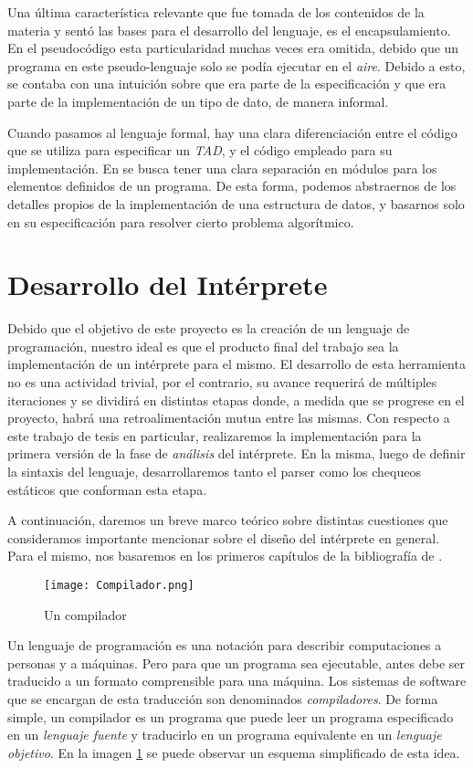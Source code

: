 Una última característica relevante que fue tomada de los contenidos de la materia y sentó las bases para el desarrollo del lenguaje, es el encapsulamiento.
En el pseudocódigo esta particularidad muchas veces era omitida, debido que un programa en este pseudo-lenguaje solo se podía ejecutar en el \textit{aire}.
Debido a esto, se contaba con una intuición sobre que era parte de la especificación y que era parte de la implementación de un tipo de dato, de manera informal.

Cuando pasamos al lenguaje formal, hay una clara diferenciación entre el código que se utiliza para especificar un \textit{TAD}, y el código empleado para su implementación.
En \Lenguaje{} se busca tener una clara separación en módulos para los elementos definidos de un programa.
De esta forma, podemos abstraernos de los detalles propios de la implementación de una estructura de datos, y basarnos solo en su especificación para resolver cierto problema algorítmico.

\section{Desarrollo del Intérprete}

Debido que el objetivo de este proyecto es la creación de un lenguaje de programación, nuestro ideal es que el producto final del trabajo sea la implementación de un intérprete para el mismo.
El desarrollo de esta herramienta no es una actividad trivial, por el contrario, su avance requerirá de múltiples iteraciones y se dividirá en distintas etapas donde, a medida que se progrese en el proyecto, habrá una retroalimentación mutua entre las mismas.
Con respecto a este trabajo de tesis en particular, realizaremos la implementación para la primera versión de la fase de \textit{análisis} del intérprete.
En la misma, luego de definir la sintaxis del lenguaje, desarrollaremos tanto el parser como los chequeos estáticos que conforman esta etapa.

A continuación, daremos un breve marco teórico sobre distintas cuestiones que consideramos importante mencionar sobre el diseño del intérprete en general.
Para el mismo, nos basaremos en los primeros capítulos de la bibliografía de \cite{Dragon}.

\begin{figure}[h]
\centering
\texttt{[image: Compilador.png]}
\caption{Un compilador}
\label{Compilador}
\end{figure}

Un lenguaje de programación es una notación para describir computaciones a personas y a máquinas.
Pero para que un programa sea ejecutable, antes debe ser traducido a un formato comprensible para una máquina.
Los sistemas de software que se encargan de esta traducción son denominados \textit{compiladores}.
De forma simple, un compilador es un programa que puede leer un programa especificado en un \textit{lenguaje fuente} y traducirlo en un programa equivalente en un \textit{lenguaje objetivo}.
En la imagen \ref{Compilador} se puede observar un esquema simplificado de esta idea.

